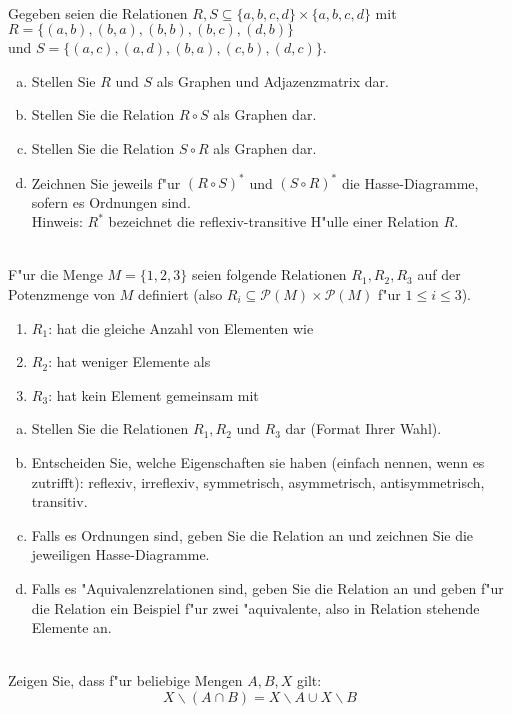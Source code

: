 \\
Gegeben seien die Relationen $R,S\subseteq\{a,b,c,d\}\times\{a,b,c,d\}$ mit $R=\{(a,b),(b,a),(b,b),(b,c),(d,b)\}$\\und $S=\{(a,c),(a,d),(b,a),(c,b),(d,c)\}$.
\begin{enumerate}[(a)]
    \item Stellen Sie $R$ und $S$ als Graphen und Adjazenzmatrix dar.
    \item Stellen Sie die Relation $R\circ S$ als Graphen dar.
    \item Stellen Sie die Relation $S\circ R$ als Graphen dar.
    \item Zeichnen Sie jeweils f"ur $(R\circ S)^*$ und $(S\circ R)^*$ die Hasse-Diagramme, sofern es Ordnungen sind.\\
    Hinweis: $R^*$ bezeichnet die reflexiv-transitive H"ulle einer Relation $R$.

\end{enumerate}

\\
F"ur die Menge $M=\{1,2,3\}$ seien folgende Relationen $R_1,R_2,R_3$ auf der Potenzmenge von $M$ definiert (also $R_i\subseteq \mathscr{P}(M)\times\mathscr{P}(M)$ f"ur $1\leq i\leq 3$).
\begin{enumerate}
\item $R_1$: \glqq hat die gleiche Anzahl von Elementen wie\grqq
\item $R_2$: \glqq hat weniger Elemente als\grqq
\item $R_3$: \glqq hat kein Element gemeinsam mit\grqq
\end{enumerate}
\begin{enumerate}[(a)]
\item Stellen Sie die Relationen $R_1,R_2$ und $R_3$ dar (Format Ihrer Wahl).
\item Entscheiden Sie, welche Eigenschaften sie haben (einfach nennen, wenn es zutrifft): reflexiv, irreflexiv, symmetrisch, asymmetrisch, antisymmetrisch, transitiv.
\item Falls es Ordnungen sind, geben Sie die Relation an und zeichnen Sie die jeweiligen Hasse-Diagramme.
\item Falls es "Aquivalenzrelationen sind, geben Sie die Relation an und geben f"ur die Relation ein Beispiel f"ur zwei "aquivalente, also in Relation stehende Elemente an.
\end{enumerate}

\\
Zeigen Sie, dass f"ur beliebige Mengen $A,B,X$ gilt: \[X\backslash (A\cap B)=X\backslash A\cup X\backslash B\]


